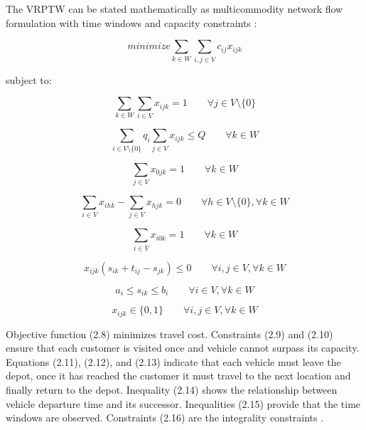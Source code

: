 \documentclass[a4paper,twoside,12pt]{book}
\begin{document}
The VRPTW can be stated mathematically as multicommodity network flow formulation with time windows and capacity constraints \cite{bib:chapter:VRPTW}: 

\begin{equation}
minimize \sum_{k \in W}\sum_{i,j \in V} c_{ij}x_{ijk}
\end{equation}

subject to:

\begin{equation}
\sum_{k \in W}\sum_{i \in V}x_{ijk} = 1 \qquad \forall j \in V \setminus \lbrace 0 \rbrace
\end{equation}

\begin{equation}
\sum_{i \in V \setminus \lbrace 0 \rbrace}q_{i} \sum_{j \in V}x_{ijk} \leq Q \qquad \forall k \in W
\end{equation}

\begin{equation}
\sum_{j \in V}x_{0jk} = 1 \qquad \forall k \in W
\end{equation}

\begin{equation}
\sum_{i \in V}x_{ihk} -\sum_{j \in V}x_{hjk} = 0 \qquad \forall h \in V \setminus \lbrace 0 \rbrace, \forall k \in W
\end{equation}

\begin{equation}
\sum_{i \in V}x_{i0k} = 1 \qquad \forall k \in W
\end{equation}

\begin{equation}
x_{ijk}(s_{ik}+t_{ij}-s_{jk}) \leq 0 \qquad \forall i,j \in V ,\forall k \in W
\end{equation}

\begin{equation}
a_{i}\leq s_{ik} \leq b_{i} \qquad \forall i \in V ,\forall k \in W
\end{equation}

\begin{equation}
x_{ijk} \in \lbrace 0,1 \rbrace \qquad \forall i,j \in V ,\forall k \in W
\end{equation}

Objective function (2.8) minimizes travel cost. Constraints (2.9) and (2.10) ensure that each customer is visited once and vehicle cannot surpass its capacity. Equations (2.11), (2.12), and (2.13) indicate that each vehicle must leave the depot, once it has reached the customer it must travel to the next location and finally return to the depot. Inequality (2.14) shows the relationship between vehicle departure time and its successor. Inequalities (2.15) provide that the time windows are observed. Constraints (2.16) are the integrality constraints \cite{bib:chapter:VRPTW}.
\end{document}
